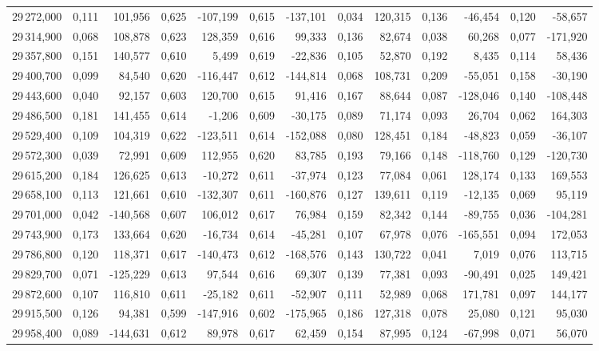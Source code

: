 \begin{longtable}{rrrrrrrrrrrrr}
29\,272,000 & 0,111 & 101,956 & 0,625 & -107,199 & 0,615 & -137,101 & 0,034 & 120,315 & 0,136 & -46,454 & 0,120 & -58,657\\
29\,314,900 & 0,068 & 108,878 & 0,623 & 128,359 & 0,616 & 99,333 & 0,136 & 82,674 & 0,038 & 60,268 & 0,077 & -171,920\\
29\,357,800 & 0,151 & 140,577 & 0,610 & 5,499 & 0,619 & -22,836 & 0,105 & 52,870 & 0,192 & 8,435 & 0,114 & 58,436\\
29\,400,700 & 0,099 & 84,540 & 0,620 & -116,447 & 0,612 & -144,814 & 0,068 & 108,731 & 0,209 & -55,051 & 0,158 & -30,190\\
29\,443,600 & 0,040 & 92,157 & 0,603 & 120,700 & 0,615 & 91,416 & 0,167 & 88,644 & 0,087 & -128,046 & 0,140 & -108,448\\
29\,486,500 & 0,181 & 141,455 & 0,614 & -1,206 & 0,609 & -30,175 & 0,089 & 71,174 & 0,093 & 26,704 & 0,062 & 164,303\\
29\,529,400 & 0,109 & 104,319 & 0,622 & -123,511 & 0,614 & -152,088 & 0,080 & 128,451 & 0,184 & -48,823 & 0,059 & -36,107\\
29\,572,300 & 0,039 & 72,991 & 0,609 & 112,955 & 0,620 & 83,785 & 0,193 & 79,166 & 0,148 & -118,760 & 0,129 & -120,730\\
29\,615,200 & 0,184 & 126,625 & 0,613 & -10,272 & 0,611 & -37,974 & 0,123 & 77,084 & 0,061 & 128,174 & 0,133 & 169,553\\
29\,658,100 & 0,113 & 121,661 & 0,610 & -132,307 & 0,611 & -160,876 & 0,127 & 139,611 & 0,119 & -12,135 & 0,069 & 95,119\\
29\,701,000 & 0,042 & -140,568 & 0,607 & 106,012 & 0,617 & 76,984 & 0,159 & 82,342 & 0,144 & -89,755 & 0,036 & -104,281\\
29\,743,900 & 0,173 & 133,664 & 0,620 & -16,734 & 0,614 & -45,281 & 0,107 & 67,978 & 0,076 & -165,551 & 0,094 & 172,053\\
29\,786,800 & 0,120 & 118,371 & 0,617 & -140,473 & 0,612 & -168,576 & 0,143 & 130,722 & 0,041 & 7,019 & 0,076 & 113,715\\
29\,829,700 & 0,071 & -125,229 & 0,613 & 97,544 & 0,616 & 69,307 & 0,139 & 77,381 & 0,093 & -90,491 & 0,025 & 149,421\\
29\,872,600 & 0,107 & 116,810 & 0,611 & -25,182 & 0,611 & -52,907 & 0,111 & 52,989 & 0,068 & 171,781 & 0,097 & 144,177\\
29\,915,500 & 0,126 & 94,381 & 0,599 & -147,916 & 0,602 & -175,965 & 0,186 & 127,318 & 0,078 & 25,080 & 0,121 & 95,030\\
29\,958,400 & 0,089 & -144,631 & 0,612 & 89,978 & 0,617 & 62,459 & 0,154 & 87,995 & 0,124 & -67,998 & 0,071 & 56,070\\

\end{longtable}
